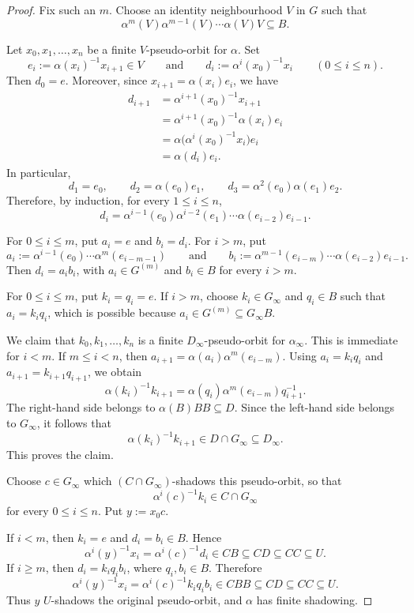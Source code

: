 \documentclass[12pt]{amsart}
\theoremstyle{definition}
\numberwithin{equation}{section}
\theoremstyle{remark}
\begin{document}
\begin{proof}
	Fix such an $m$. Choose an identity neighbourhood $V$ in $G$ such
	that
	\[
	\alpha^m(V)\alpha^{m-1}(V)\cdots\alpha(V)V\subseteq B.
	\]
	
	Let $x_0,x_1,\ldots,x_n$ be a finite $V$-pseudo-orbit for $\alpha$. Set
\[
e_i:=\alpha(x_i)^{-1}x_{i+1}\in V
\qquad
\text{and}
\qquad
d_i:=\alpha^i(x_0)^{-1}x_i
\qquad(0\leq i\leq n).
\]
Then $d_0=e$. Moreover, since
$x_{i+1}=\alpha(x_i)e_i$, we have
\[
\begin{aligned}
	d_{i+1}
	&=\alpha^{i+1}(x_0)^{-1}x_{i+1}\\
	&=\alpha^{i+1}(x_0)^{-1}\alpha(x_i)e_i\\
	&=\alpha\bigl(\alpha^i(x_0)^{-1}x_i\bigr)e_i\\
	&=\alpha(d_i)e_i.
\end{aligned}
\]
In particular,
\[
d_1=e_0,\qquad
d_2=\alpha(e_0)e_1,\qquad
d_3=\alpha^2(e_0)\alpha(e_1)e_2.
\]
Therefore, by induction, for every $1\leq i\leq n$,
\[
d_i
=
\alpha^{i-1}(e_0)\alpha^{i-2}(e_1)\cdots
\alpha(e_{i-2})e_{i-1}.
\]	
	
	For $0\leq i\leq m$, put $a_i=e$ and $b_i=d_i$. For $i>m$, put
	\[
	a_i
	:=
	\alpha^{i-1}(e_0)\cdots\alpha^m(e_{i-m-1})
	\qquad
	\text{and}
	\qquad
	b_i
	:=
	\alpha^{m-1}(e_{i-m})\cdots\alpha(e_{i-2})e_{i-1}.
	\]
	Then $d_i=a_ib_i$, with $a_i\in G^{(m)}$ and $b_i\in B$ for every $i>m$.
	
	For $0\leq i\leq m$, put $k_i=q_i=e$. If $i>m$, choose
	$k_i\in G_\infty$ and $q_i\in B$ such that $a_i=k_iq_i$,
	which is possible because $a_i\in G^{(m)}\subseteq G_\infty B$.
	
	We claim that $k_0,k_1,\ldots,k_n$ is a finite
	$D_\infty$-pseudo-orbit for $\alpha_\infty$. This is immediate for
	$i<m$. If $m\leq i<n$, then $a_{i+1}=\alpha(a_i)\alpha^m(e_{i-m})$.
	Using $a_i=k_iq_i$ and $a_{i+1}=k_{i+1}q_{i+1}$, we obtain
	\[
	\alpha(k_i)^{-1}k_{i+1}
	=
	\alpha(q_i)\alpha^m(e_{i-m})q_{i+1}^{-1}.
	\]
	The right-hand side belongs to $\alpha(B)BB\subseteq D$. Since the
	left-hand side belongs to $G_\infty$, it follows that
	\[
	\alpha(k_i)^{-1}k_{i+1}
	\in D\cap G_\infty
	\subseteq D_\infty.
	\]
	This proves the claim.
	
	Choose $c\in G_\infty$ which $(C\cap G_\infty)$-shadows this
	pseudo-orbit, so that
	\[
	\alpha^i(c)^{-1}k_i\in C\cap G_\infty
	\]
	for every $0\leq i\leq n$. Put $y:=x_0c$.
	
	If $i<m$, then $k_i=e$ and $d_i=b_i\in B$. Hence
	\[
	\alpha^i(y)^{-1}x_i
	=
	\alpha^i(c)^{-1}d_i
	\in CB
	\subseteq CD
	\subseteq CC
	\subseteq U.
	\]
	If $i\geq m$, then $d_i=k_iq_ib_i$, where $q_i,b_i\in B$. Therefore
	\[
	\alpha^i(y)^{-1}x_i
	=
	\alpha^i(c)^{-1}k_iq_ib_i
	\in CBB
	\subseteq CD
	\subseteq CC
	\subseteq U.
	\]
	Thus $y$ $U$-shadows the original pseudo-orbit, and $\alpha$ has
	finite shadowing.
\end{proof}
\end{document}
